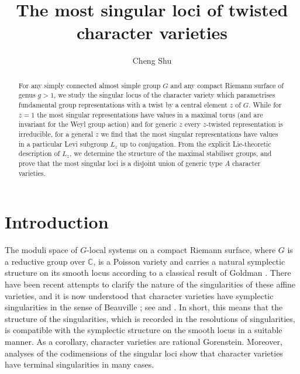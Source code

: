 \documentclass[11pt,oneside,dvipsnames]{amsart}
\title{The most singular loci of twisted character varieties}
\author{Cheng Shu}
\theoremstyle{plain}
\theoremstyle{definition}
\theoremstyle{named}
\begin{document}
\let\bs\boldsymbol
\begin{abstract}
For any simply connected almost simple group $G$ and any compact Riemann surface of genus $g>1$, we study the singular locus of the character variety which parametrises fundamental group representations with a twist by a central element $z$ of $G$. While for $z=1$ the most singular representations have values in a maximal torus (and are invariant for the Weyl group action) and for generic $z$ every $z$-twisted representation is irreducible, for a general $z$ we find that the most singular representations have values in a particular Levi subgroup $L_z$ up to conjugation. From the explicit Lie-theoretic description of $L_z$, we determine the structure of the maximal stabiliser groups, and prove that the most singular loci is a disjoint union of generic type $A$ character varieties. 
\end{abstract}
\maketitle

\tableofcontents
{}
\setcounter{tocdepth}{1}
\section{Introduction}\label{INT}

The moduli space of $G$-local systems on a compact Riemann surface, where $G$ is a reductive group over $\mathbb{C}$, is a Poisson variety and carries a natural symplectic structure on its smooth locus according to a classical result of Goldman \cite{G1}. There have been recent attempts to clarify the nature of the singularities of these affine varieties, and it is now understood that character varieties have symplectic singularities in the sense of Beauville \cite{Beau}; see \cite{BS} and \cite{Shu4}. In short, this means that the structure of the singularities, which is recorded in the resolutions of singularities, is compatible with the symplectic structure on the smooth locus in a suitable manner. As a corollary, character varieties are rational Gorenstein. Moreover, analyses of the codimensions of the singular loci show that character varieties have terminal singularities in many cases.
\end{document}
